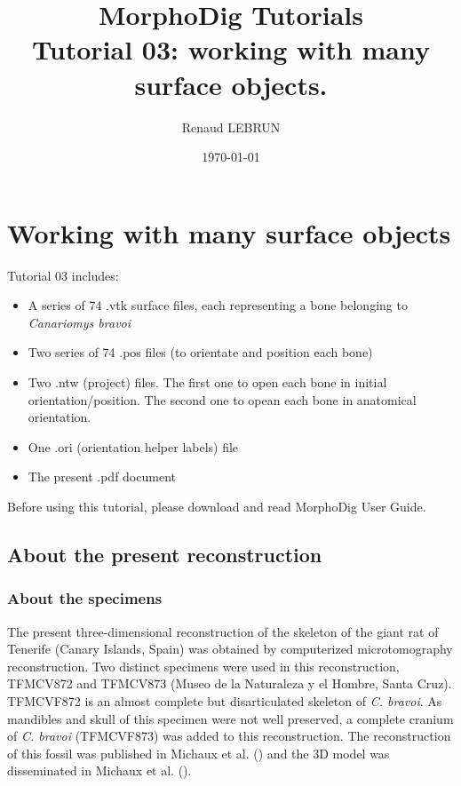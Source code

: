 \documentclass[12pt, a4paper]{book}
\title{MorphoDig Tutorials\\Tutorial 03: working with many surface objects.}
\author{Renaud LEBRUN}
\affil{Institut des Sciences de l'Evolution, Université de Montpellier, France}
\date{\today}
\begin{document}
\dominitoc	

\maketitle


\tableofcontents

\chapter{Working with many surface objects}


\minitoc 
Tutorial 03 includes:
\begin{itemize}
\item A series of 74 .vtk surface files, each representing a bone belonging to \textit{Canariomys bravoi}
\item Two series of 74 .pos files (to orientate and position each bone)
\item Two .ntw (project) files. The first one to open each bone in initial orientation/position. The second one to opean each bone in anatomical orientation.
\item One .ori (orientation helper labels) file 
\item The present .pdf document
\end{itemize}

Before using this tutorial, please download and read MorphoDig User Guide.


\section{About the present reconstruction}
\subsection{About the specimens}
The present three-dimensional reconstruction of the skeleton of the giant rat of Tenerife (Canary
Islands, Spain) was obtained by computerized microtomography reconstruction. Two distinct specimens
were used in this reconstruction, TFMCV872 and TFMCV873 (Museo de la Naturaleza y el
Hombre, Santa Cruz). TFMCVF872 is an almost complete but disarticulated skeleton of \textit{C. bravoi}. As
mandibles and skull of this specimen were not well preserved, a complete cranium of \textit{C. bravoi} (TFMCVF873)
was added to this reconstruction. The reconstruction of this fossil was published in Michaux et al. (\citep{MichauxJ2012}) and the 3D model was disseminated  in Michaux et al. (\citep{MichauxJ2015}).\\
\end{document}
